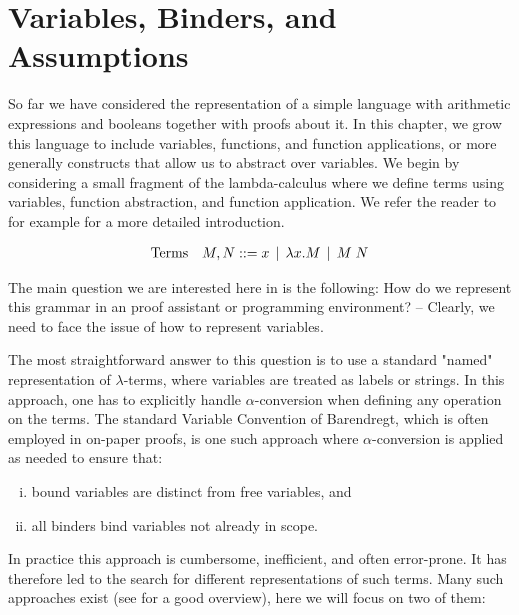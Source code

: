 \chapter{Variables, Binders, and Assumptions}
\label{chap:binders}
So far we have considered the representation of a simple language with
arithmetic expressions and booleans together with proofs about it. In this
chapter, we grow this language to include variables, functions, and function applications,
or more generally constructs that allow us to abstract over
variables. We begin by considering a small fragment of the
lambda-calculus where we define terms using variables, function
abstraction, and function application. We refer the reader to for
example \citep[Ch 5, Ch 9]{TAPL} for a more detailed introduction.

\[
\begin{array}{ll@{\bnfas}l}
\mbox{Terms} & M, N & x \bnfalt \lam x.M \bnfalt M \app N
\end{array}
\]

The main question we are interested here in is the following: How do we
represent this grammar in an proof assistant or programming environment? -- Clearly, we need to
face the issue of how to represent variables.

The most straightforward answer to this question is to use a standard "named" representation of
$\lambda$-terms, where variables are treated as labels or strings. In
this approach, one has to explicitly handle $\alpha$-conversion when
defining any operation on the terms. The standard Variable Convention
of Barendregt, which is often employed in on-paper proofs, is one such
approach where $\alpha$-conversion is applied as needed to ensure
that:

\begin{enumerate}[(i)]
\item bound variables are distinct from free variables, and
\item all binders bind variables not already in scope.
\end{enumerate}

In practice this approach is cumbersome, inefficient, and often error-prone. It
has therefore led to the search for different representations of such
terms. Many such approaches exist (see \cite{Aydemir:TechReport09} for
a good overview), here we will focus on two of them:

